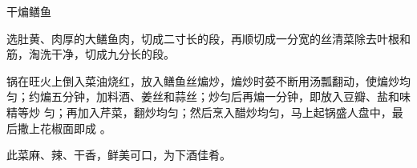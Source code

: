 \begin{recipe}{干煸鳝鱼}

\ingredients


\preparation

\step 选肚黄、肉厚的大鳝鱼肉，切成二寸长的段，再顺切成一分宽的丝清菜除去叶根和
筋，淘洗干净，切成九分长的段。

\step 锅在旺火上倒入菜油烧红，放入鳝鱼丝煸炒，煸炒时荽不断用汤瓢翻动，使煸炒均
匀；约煸五分钟，加料酒、姜丝和蒜丝；炒匀后再煸一分钟，即放入豆瓣、盐和味精等炒
匀；再加入芹菜，翻炒均匀；然后烹入醋炒均匀，马上起锅盛人盘中，最后撒上花椒面即成
。

\features

此菜麻、辣、干香，鲜美可口，为下酒佳肴。

\end{recipe}

